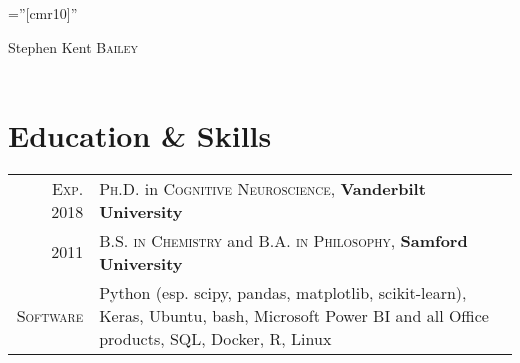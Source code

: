 \documentclass[a4paper,11pt]{article}
\begin{document}
\pagestyle{empty} %

\font\fb=''[cmr10]'' %

\par{\centering
		{\Huge Stephen Kent \textsc{Bailey}
	}\\ \medskip}
\\ \medskip
\parbox{12.2cm}{}


\section{Education \& Skills}
\begin{tabular}{rp{11cm}}	

    \textsc{Exp.} 2018 & \textsc{Ph.D.} in \textsc{Cognitive Neuroscience}, \textbf{Vanderbilt University} \smallskip \\
    
    2011 & \textsc{B.S. in Chemistry} and \textsc{B.A. in Philosophy}, \textbf{Samford University} \smallskip \\

    \textsc{Software} & \small{Python (esp. scipy, pandas, matplotlib, scikit-learn), Keras, Ubuntu, bash, Microsoft Power BI and all Office products,  SQL, Docker, R, Linux} \\


\end{tabular}
\end{document}
